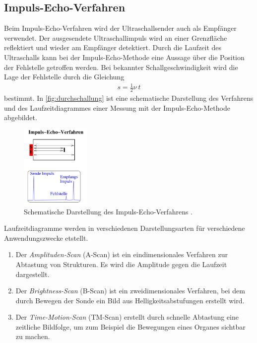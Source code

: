 \subsection*{Impuls-Echo-Verfahren}
\label{subsec:ImpEcho}

Beim Impuls-Echo-Verfahren wird der Ultraschallsender auch als Empfänger verwendet. Der ausgesendete Ultraschallimpuls wird an einer Grenzfläche reflektiert und wieder am Empfänger detektiert. Durch die Laufzeit des
Ultraschalls kann bei der Impuls-Echo-Methode eine Aussage über die Position der Fehlstelle getroffen werden. Bei bekannter Schallgeschwindigkeit wird die Lage der Fehlstelle durch die Gleichung 
\begin{align}
    \label{eqn:lageFehler}
    s = \frac 12 \nu ~ t
\end{align}
bestimmt. 
In \autoref{fig:durchschallung} ist eine schematische Darstellung des Verfahrens und des Laufzeitdiagrammes einer Messung mit der Impuls-Echo-Methode abgebildet.
\begin{figure}[H]
    \centering
    \includegraphics[width=0.3\textwidth]{data/ImpulsEchoVerfahren.png}
    \caption{Schematische Darstellung des Impuls-Echo-Verfahrens \cite{AnleitungUS2}.}
    \label{fig:durchschallung}
\end{figure}
Laufzeitdiagramme werden in verschiedenen Darstellungsarten für verschiedene Anwendungszwecke etstellt.
\begin{enumerate}
    \item Der \textit{Amplituden-Scan} (A-Scan) ist ein eindimensionales Verfahren zur Abtastung von Strukturen. Es wird die Amplitude gegen die Laufzeit dargestellt.
    \item Der \textit{Brightness-Scan} (B-Scan) ist ein zweidimensionales Verfahren, bei dem durch Bewegen der Sonde ein Bild aus Helligkeitsabstufungen erstellt wird.
    \item Der \textit{Time-Motion-Scan} (TM-Scan) erstellt durch schnelle Abtastung eine zeitliche Bildfolge, um zum Beispiel die Bewegungen eines Organes sichtbar zu machen.
\end{enumerate}
